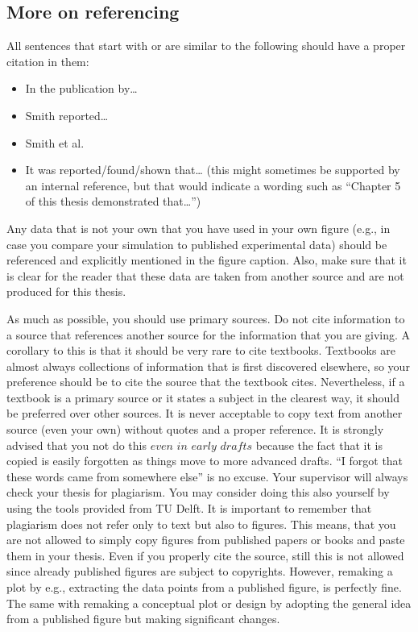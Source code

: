 \documentclass{article}
\begin{document}
\subsection{More on referencing}
All sentences that start with or are similar to the following should have a proper citation in them:
\begin{itemize}
    \item In the publication by…
    \item Smith reported…
    \item Smith et al.
    \item It was reported/found/shown that… (this might sometimes be supported by an internal reference, but that would indicate a wording such as “Chapter 5 of this thesis demonstrated that…”)
\end{itemize}
Any data that is not your own that you have used in your own figure (e.g., in case you compare your simulation to published experimental data) should be referenced and explicitly mentioned in the figure caption. Also, make sure that it is clear for the reader that these data are taken from another source and are not produced for this thesis. 

As much as possible, you should use primary sources. Do not cite information to a source that references another source for the information that you are giving. A corollary to this is that it should be very rare to cite textbooks. Textbooks are almost always collections of information that is first discovered elsewhere, so your preference should be to cite the source that the textbook cites. Nevertheless, if a textbook is a primary source or it states a subject in the clearest way, it should be preferred over other sources. It is never acceptable to copy text from another source (even your own) without quotes and a proper reference. It is strongly advised that you not do this $even$ $in$ $early$ $drafts$ because the fact that it is copied is easily forgotten as things move to more advanced drafts. “I forgot that these words came from somewhere else” is no excuse. Your supervisor will always check your thesis for plagiarism. You may consider doing this also yourself by using the tools provided from TU Delft. It is important to remember that plagiarism does not refer only to text but also to figures. This means, that you are not allowed to simply copy figures from published papers or books and paste them in your thesis. Even if you properly cite the source, still this is not allowed since already published figures are subject to copyrights. However, remaking a plot by e.g., extracting the data points from a published figure, is perfectly fine. The same with remaking a conceptual plot or design by adopting the general idea from a published figure but making significant changes.
\end{document}
